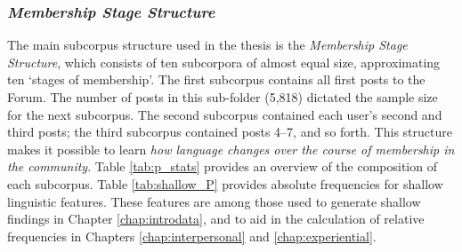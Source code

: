 
\subsubsection*{\emph{Membership Stage Structure}}

The main subcorpus structure used in the thesis is the \emph{Membership Stage Structure}, which consists of ten subcorpora of almost equal size, approximating ten `stages of membership'. The first subcorpus contains all first \glspl{post} to the \gls{Forum}. The number of \glspl{post} in this sub\hyp{}folder (5,818) dictated the sample size for the next subcorpus. The second subcorpus contained each user's second and third \glspl{post}; the third subcorpus contained \glspl{post} 4--7, and so forth. This structure makes it possible to learn \emph{how language changes over the course of membership in the community}. Table \ref{tab:p_stats} provides an overview of the composition of each subcorpus. Table \ref{tab:shallow_P} provides absolute frequencies for shallow linguistic features. These features are among those used to generate shallow findings in Chapter \ref{chap:introdata}, and to aid in the calculation of relative frequencies in Chapters \ref{chap:interpersonal} and \ref{chap:experiential}.

